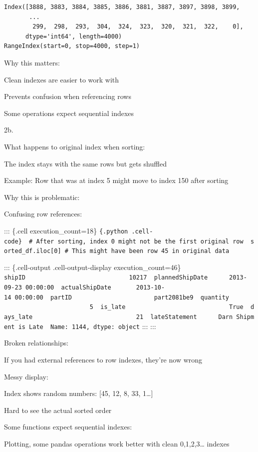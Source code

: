 \documentclass[
  letterpaper,
  DIV=11,
  numbers=noendperiod]{scrartcl}
\begin{document}
\begin{verbatim}
Index([3888, 3883, 3884, 3885, 3886, 3881, 3887, 3897, 3898, 3899,
       ...
        299,  298,  293,  304,  324,  323,  320,  321,  322,    0],
      dtype='int64', length=4000)
RangeIndex(start=0, stop=4000, step=1)
\end{verbatim}

Why this matters:

Clean indexes are easier to work with

Prevents confusion when referencing rows

Some operations expect sequential indexes

2b.

What happens to original index when sorting:

The index stays with the same rows but gets shuffled

Example: Row that was at index 5 might move to index 150 after sorting

Why this is problematic:

Confusing row references:

::: \{.cell execution\_count=18\}
\texttt{\{.python\ .cell-code\}\ \ \#\ After\ sorting,\ index\ 0\ might\ not\ be\ the\ first\ original\ row\ \ sorted\_df.iloc{[}0{]}\ \#\ This\ might\ have\ been\ row\ 45\ in\ original\ data}

::: \{.cell-output .cell-output-display execution\_count=46\}
\texttt{shipID\ \ \ \ \ \ \ \ \ \ \ \ \ \ \ \ \ \ \ \ \ \ \ \ \ \ \ \ \ 10217\ \ plannedShipDate\ \ \ \ \ \ 2013-09-23\ 00:00:00\ \ actualShipDate\ \ \ \ \ \ \ 2013-10-14\ 00:00:00\ \ partID\ \ \ \ \ \ \ \ \ \ \ \ \ \ \ \ \ \ \ \ \ \ \ part2081be9\ \ quantity\ \ \ \ \ \ \ \ \ \ \ \ \ \ \ \ \ \ \ \ \ \ \ \ \ \ \ \ \ \ \ 5\ \ is\_late\ \ \ \ \ \ \ \ \ \ \ \ \ \ \ \ \ \ \ \ \ \ \ \ \ \ \ \ \ True\ \ days\_late\ \ \ \ \ \ \ \ \ \ \ \ \ \ \ \ \ \ \ \ \ \ \ \ \ \ \ \ \ 21\ \ lateStatement\ \ \ \ \ \ Darn\ Shipment\ is\ Late\ \ Name:\ 1144,\ dtype:\ object}
::: :::

Broken relationships:

If you had external references to row indexes, they're now wrong

Messy display:

Index shows random numbers: {[}45, 12, 8, 33, 1\ldots{]}

Hard to see the actual sorted order

Some functions expect sequential indexes:

Plotting, some pandas operations work better with clean 0,1,2,3\ldots{}
indexes
\end{document}
